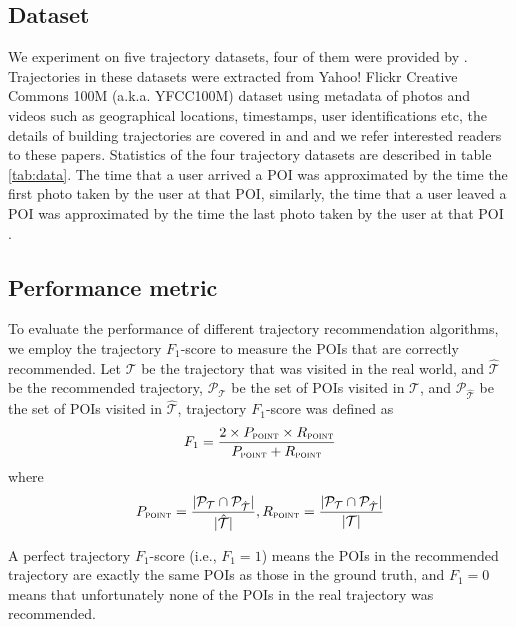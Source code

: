 \subsection{Dataset}
\label{sec:dataset}
We experiment on five trajectory datasets, four of them were provided by \cite{ijcai15}.
Trajectories in these datasets were extracted from Yahoo! Flickr Creative Commons 100M
(a.k.a. YFCC100M) dataset\cite{thomee2016yfcc100m} using metadata of photos and videos
such as geographical locations, timestamps, user identifications etc,
the details of building trajectories are covered in \cite{ht10} and \cite{ijcai15} and
we refer interested readers to these papers.
Statistics of the four trajectory datasets are described in table \ref{tab:data}.
%
The time that a user arrived a POI was approximated by the time the first photo taken by the user at that POI,
similarly, the time that a user leaved a POI was approximated by the time the last photo taken by the user at
that POI \cite{ht10, ijcai15}.


\subsection{Performance metric}
\label{sec:metric}


To evaluate the performance of different trajectory recommendation algorithms,
we employ the trajectory $F_1$-score\cite{ijcai15} to measure the POIs that are
correctly recommended. Let $\mathcal{T}$ be the trajectory that was visited in the real world,
and $\hat{\mathcal{T}}$ be the recommended trajectory,
$\mathcal{P}_{\mathcal{T}}$ be the set of POIs visited in $\mathcal{T}$,
and $\mathcal{P}_{\hat{\mathcal{T}}}$ be the set of POIs visited in $\hat{\mathcal{T}}$,
trajectory $F_1$-score was defined as
\begin{displaymath}
F_1= \frac{2 \times P_{\textsc{point}} \times R_{\textsc{point}}}
          {P_{\textsc{point}} + R_{\textsc{point}}}
\end{displaymath}
where
\begin{displaymath}
P_{\textsc{point}} = \frac{|\mathcal{P}_{\mathcal{T}} \cap \mathcal{P}_{\hat{\mathcal{T}}}|}
                          {|\hat{\mathcal{T}}|},
R_{\textsc{point}} = \frac{|\mathcal{P}_{\mathcal{T}} \cap \mathcal{P}_{\hat{\mathcal{T}}}|}
                          {|\mathcal{T}|}
\end{displaymath}

A perfect trajectory $F_1$-score (i.e., $F_1 = 1$) means the POIs in 
the recommended trajectory are exactly the same POIs as those in the ground truth, 
and $F_1 = 0$ means that unfortunately none of the POIs in the 
real trajectory was recommended.

